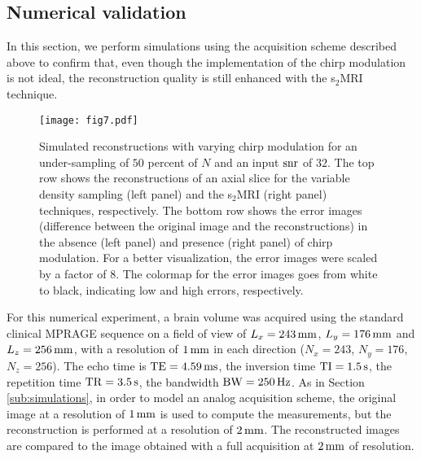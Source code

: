\documentclass[10pt,draftcls, onecolumn]{IEEEtran}
\begin{document}
\subsection{Numerical validation}
\label{sub:numerical experiments}

In this section, we perform simulations using the acquisition scheme described above to confirm that, even though the implementation of the chirp modulation is not ideal, the reconstruction quality is still enhanced with the s$_2$MRI technique.

\begin{figure}
\centering
\texttt{[image: fig7.pdf]}
\caption{\label{fig:simulated reconstruction 3D} Simulated reconstructions with varying chirp modulation for an under-sampling of $50$ percent of $N$ and an input $\rm snr$ of $32$. The top row shows the reconstructions of an axial slice for the variable density sampling (left panel) and the s$_2$MRI (right panel) techniques, respectively. The bottom row shows the error images (difference between the original image and the reconstructions) in the absence (left panel) and presence (right panel) of chirp modulation. For a better visualization, the error images were scaled by a factor of $8$. The colormap for the error images goes from white to black, indicating low and high errors, respectively.}
\vspace{-3mm}
\end{figure}


For this numerical experiment, a brain volume was acquired using the standard clinical MPRAGE sequence on a field of view of $L_x = 243\,\rm{mm}$, $L_y = 176\,\rm{mm}$ and $L_z = 256\,\rm{mm}$, with a resolution of $1\,\rm{mm}$ in each direction ($N_x = 243$, $N_y = 176$, $N_z = 256$). The echo time is $\rm{TE} = 4.59\,\rm{ms}$, the inversion time $\rm{TI} = 1.5\,\rm{s}$, the repetition time $\rm{TR} = 3.5\,\rm{s}$, the bandwidth $\rm{BW} = 250\,\rm{Hz}$. As in Section \ref{sub:simulations}, in order to model an analog acquisition scheme, the original image at a resolution of $1 \, \rm{mm}$ is used to compute the measurements, but the reconstruction is performed at a resolution of $2 \, \rm{mm}$. The reconstructed images are compared to the image obtained with a full acquisition at $2 \, \rm{mm}$ of resolution. 
\end{document}
